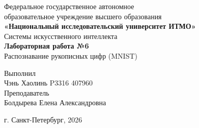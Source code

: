 \begin{titlepage}
    \centering
    Федеральное государственное автономное\\
    образовательное учреждение высшего образования\\
    \textbf{«Национальный исследовательский университет ИТМО»}\\
    \vfill
    Системы искусственного интеллекта\\
    \vspace{0.5\baselineskip}
    \textbf{Лабораторная работа №6}\\
    \vspace{0.5\baselineskip}
    Распознавание рукописных цифр (MNIST)\\
    \vfill
    \begin{flushright}
    Выполнил\\
    Чэнь Хаолинь P3316 407960\\[0.5\baselineskip]
    Преподаватель\\
    Болдырева Елена Александровна
    \end{flushright}
    \vspace{4\baselineskip}
    г. Санкт-Петербург, 2026
\end{titlepage}

